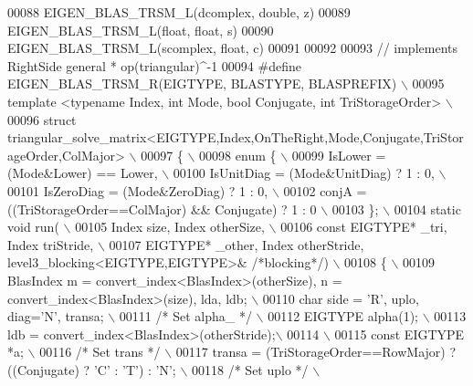\begin{DoxyCode}
00088 EIGEN\_BLAS\_TRSM\_L(dcomplex, \textcolor{keywordtype}{double}, z)
00089 EIGEN\_BLAS\_TRSM\_L(\textcolor{keywordtype}{float},    \textcolor{keywordtype}{float},  s)
00090 EIGEN\_BLAS\_TRSM\_L(scomplex, \textcolor{keywordtype}{float},  c)
00091 
00092 
00093 \textcolor{comment}{// implements RightSide general * op(triangular)^-1}
00094 \textcolor{preprocessor}{#define EIGEN\_BLAS\_TRSM\_R(EIGTYPE, BLASTYPE, BLASPREFIX) \(\backslash\)}
00095 \textcolor{preprocessor}{template <typename Index, int Mode, bool Conjugate, int TriStorageOrder> \(\backslash\)}
00096 \textcolor{preprocessor}{struct triangular\_solve\_matrix<EIGTYPE,Index,OnTheRight,Mode,Conjugate,TriStorageOrder,ColMajor> \(\backslash\)}
00097 \textcolor{preprocessor}{\{ \(\backslash\)}
00098 \textcolor{preprocessor}{  enum \{ \(\backslash\)}
00099 \textcolor{preprocessor}{    IsLower = (Mode&Lower) == Lower, \(\backslash\)}
00100 \textcolor{preprocessor}{    IsUnitDiag  = (Mode&UnitDiag) ? 1 : 0, \(\backslash\)}
00101 \textcolor{preprocessor}{    IsZeroDiag  = (Mode&ZeroDiag) ? 1 : 0, \(\backslash\)}
00102 \textcolor{preprocessor}{    conjA = ((TriStorageOrder==ColMajor) && Conjugate) ? 1 : 0 \(\backslash\)}
00103 \textcolor{preprocessor}{  \}; \(\backslash\)}
00104 \textcolor{preprocessor}{  static void run( \(\backslash\)}
00105 \textcolor{preprocessor}{      Index size, Index otherSize, \(\backslash\)}
00106 \textcolor{preprocessor}{      const EIGTYPE* \_tri, Index triStride, \(\backslash\)}
00107 \textcolor{preprocessor}{      EIGTYPE* \_other, Index otherStride, level3\_blocking<EIGTYPE,EIGTYPE>& }\textcolor{comment}{/*blocking*/}\textcolor{preprocessor}{) \(\backslash\)}
00108 \textcolor{preprocessor}{  \{ \(\backslash\)}
00109 \textcolor{preprocessor}{   BlasIndex m = convert\_index<BlasIndex>(otherSize), n = convert\_index<BlasIndex>(size), lda, ldb; \(\backslash\)}
00110 \textcolor{preprocessor}{   char side = 'R', uplo, diag='N', transa; \(\backslash\)}
00111 \textcolor{preprocessor}{   }\textcolor{comment}{/* Set alpha\_ */}\textcolor{preprocessor}{ \(\backslash\)}
00112 \textcolor{preprocessor}{   EIGTYPE alpha(1); \(\backslash\)}
00113 \textcolor{preprocessor}{   ldb = convert\_index<BlasIndex>(otherStride);\(\backslash\)}
00114 \textcolor{preprocessor}{\(\backslash\)}
00115 \textcolor{preprocessor}{   const EIGTYPE *a; \(\backslash\)}
00116 \textcolor{preprocessor}{}\textcolor{comment}{/* Set trans */}\textcolor{preprocessor}{ \(\backslash\)}
00117 \textcolor{preprocessor}{   transa = (TriStorageOrder==RowMajor) ? ((Conjugate) ? 'C' : 'T') : 'N'; \(\backslash\)}
00118 \textcolor{preprocessor}{}\textcolor{comment}{/* Set uplo */}\textcolor{preprocessor}{ \(\backslash\)}

\end{DoxyCode}
